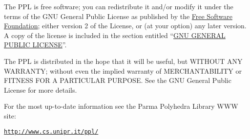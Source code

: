 \documentclass[a4paper]{article}
\begin{document}
The PPL is free software; you can redistribute it and/or modify it
under the terms of the GNU General Public License as published by the
\href{http://www.fsf.org}{Free Software Foundation}; either version 2
of the License, or (at your option) any later version.
A copy of the license is included in the section entitled
``\hyperlink{GPL}{GNU GENERAL PUBLIC LICENSE}''.

The PPL is distributed in the hope that it will be useful, but WITHOUT
ANY WARRANTY; without even the implied warranty of MERCHANTABILITY or
FITNESS FOR A PARTICULAR PURPOSE.  See the GNU General Public License
for more details.

For the most up-to-date information see the Parma Polyhedra Library
WWW site:
\begin{center}
\href{http://www.cs.unipr.it/ppl/}{\tt http://www.cs.unipr.it/ppl/}
\end{center}

\tableofcontents
{}
\end{document}
